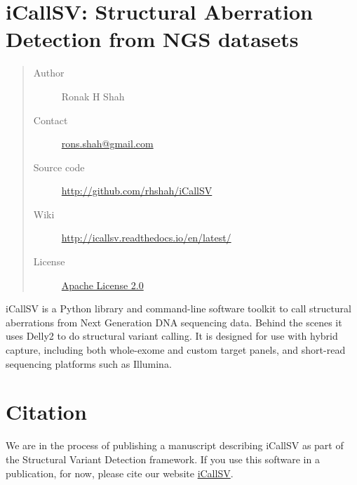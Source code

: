 \documentclass[letterpaper,10pt,english]{sphinxmanual}
\begin{document}
\section{iCallSV: Structural Aberration Detection from NGS datasets}
\label{iCallSV::doc}\label{iCallSV:icallsv-structural-aberration-detection-from-ngs-datasets}\begin{quote}\begin{description}
\item[{Author}] \leavevmode
Ronak H Shah

\item[{Contact}] \leavevmode
\href{mailto:rons.shah@gmail.com}{rons.shah@gmail.com}

\item[{Source code}] \leavevmode
\href{http://github.com/rhshah/iCallSV}{http://github.com/rhshah/iCallSV}

\item[{Wiki}] \leavevmode
\href{http://icallsv.readthedocs.io/en/latest/}{http://icallsv.readthedocs.io/en/latest/}

\item[{License}] \leavevmode
\href{http://www.apache.org/licenses/LICENSE-2.0}{Apache License 2.0}

\end{description}\end{quote}
\href{https://landscape.io/github/rhshah/iCallSV/master}{}
iCallSV is a Python library and command-line software toolkit to call structural aberrations from Next Generation DNA sequencing data. Behind the scenes it uses Delly2 to do structural variant calling. It is designed for use with hybrid capture, including both whole-exome and custom target panels, and
short-read sequencing platforms such as Illumina.


\section{Citation}
\label{iCallSV:citation}
We are in the process of publishing a manuscript describing iCallSV as part of the Structural Variant Detection framework.
If you use this software in a publication, for now, please cite our website \href{http://github.com/rhshah/iCallSV}{iCallSV}.
\end{document}
